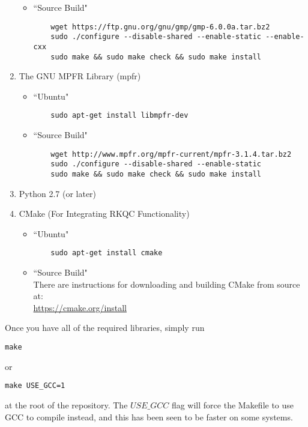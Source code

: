 \begin{enumerate}
\begin{itemize}
    \item ``Source Build"
    \begin{lstlisting}
    wget https://ftp.gnu.org/gnu/gmp/gmp-6.0.0a.tar.bz2
    sudo ./configure --disable-shared --enable-static --enable-cxx
    sudo make && sudo make check && sudo make install
    \end{lstlisting}
  \end{itemize}

  \item The GNU MPFR Library (mpfr)
  \begin{itemize}    
    \item ``Ubuntu"
    \begin{lstlisting}
    sudo apt-get install libmpfr-dev
    \end{lstlisting}

    \item ``Source Build"
    \begin{lstlisting}
    wget http://www.mpfr.org/mpfr-current/mpfr-3.1.4.tar.bz2
    sudo ./configure --disable-shared --enable-static
    sudo make && sudo make check && sudo make install
    \end{lstlisting}
  \end{itemize}

  \item Python 2.7 (or later)

  \item CMake (For Integrating RKQC Functionality)
  \begin{itemize}
    \item ``Ubuntu"
    \begin{lstlisting}
    sudo apt-get install cmake
    \end{lstlisting}

    \item ``Source Build" \\
    There are instructions for downloading and building CMake from source at: \\
    \url{https://cmake.org/install}
  \end{itemize}

\end{enumerate}

Once you have all of the required libraries, simply run 
\begin{lstlisting}
make
\end{lstlisting} 
or 
\begin{lstlisting}
make USE_GCC=1
\end{lstlisting} 
at the root of the repository. The $USE\_GCC$ flag will force the 
Makefile to use GCC to compile instead, and this has been seen to be faster 
on some systems.

